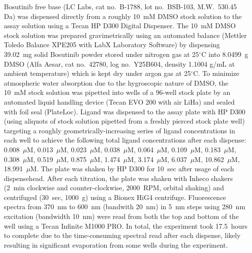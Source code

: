 \documentclass[phd,tocprelim]{cornell}
\begin{document}
Bosutinib free base (LC Labs, cat no.\ B-1788, lot no.\ BSB-103, M.W.\ 530.45 Da) was dispensed directly from a roughly 10~mM DMSO stock solution to the assay solution using a Tecan HP D300 Digital Dispenser. 
The 10~mM DMSO stock solution was prepared gravimetrically using an automated balance (Mettler Toledo Balance XPE205 with LabX Laboratory Software) by dispensing 39.02~mg solid Bosutinib powder stored under nitrogen gas at 25$^{\circ}$C into 8.0499~g DMSO (Alfa Aesar, cat no.\ 42780, log no.\ Y25B604, density 1.1004 g/mL at ambient temperature) which is kept dry under argon gas at 25$^{\circ}$C. 
To minimize atmospheric water absorption due to the hygroscopic nature of DMSO, the 10~mM stock solution was pipetted into wells of a 96-well stock plate by an automated liquid handling device (Tecan EVO 200 with air LiHa) and sealed with foil seal (PlateLoc).
Ligand was dispensed to the assay plate with HP D300 (using aliquots of stock solution pipetted from a freshly pierced stock plate well) targeting a roughly geometrically-increasing series of ligand concentrations in each well to achieve the following total ligand concentrations after each dispense: 0.008~$\mu$M, 0.013~$\mu$M, 0.023~$\mu$M, 0.038~$\mu$M, 0.064~$\mu$M, 0.109~$\mu$M, 0.183~$\mu$M, 0.308~$\mu$M, 0.519~$\mu$M, 0.875~$\mu$M, 1.474~$\mu$M, 3.174~$\mu$M, 6.037~$\mu$M, 10.862~$\mu$M, 18.991~$\mu$M. 
The plate was shaken by HP D300 for 10~sec after usage of each dispensehead.   
After each titration, the plate was shaken with Inheco shakers (2~min clockwise and counter-clockwise, 2000~RPM, orbital shaking) and centrifuged (30~sec, 1000~g) using a Bionex HiG4 centrifuge. Fluorescence spectra from 370~nm to 600~nm (bandwith 20~nm) in 5~nm steps using 280~nm excitation (bandwidth 10~nm) were read from both the top and bottom of the well using a Tecan Infinite M1000 PRO. 
In total, the experiment took 17.5~hours to complete due to the time-consuming spectral read after each dispense, likely resulting in significant evaporation from some wells during the experiment. 
\end{document}
